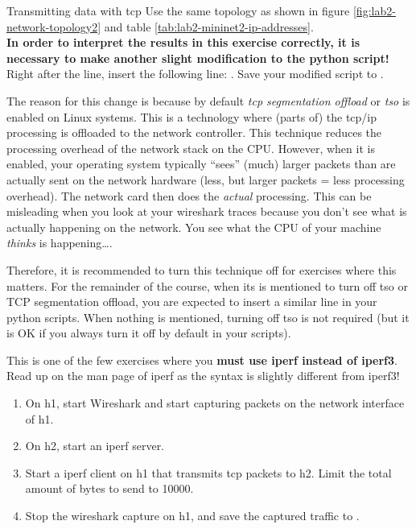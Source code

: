 \begin{exercise}{Transmitting data with \ac{tcp}}
Use the same topology as shown in figure \ref{fig:lab2-network-topology2} and table \ref{tab:lab2-mininet2-ip-addresses}.\\
\remark \textbf{In order to interpret the results in this exercise correctly, it is necessary to make another slight modification to the python script!} Right after the  line, insert the following line: . Save your modified script to .

The reason for this change is because by default \emph{\acs{tcp} segmentation offload} or \emph{tso} is enabled on Linux systems. This is a technology where (parts of) the \acs{tcp}/\acs{ip} processing is offloaded to the network controller. This technique reduces the processing overhead of the network stack on the CPU. However, when it is enabled, your operating system typically ``sees'' (much) larger packets than are actually sent on the network hardware (less, but larger packets = less processing overhead). The network card then does the \emph{actual} processing. This can be misleading when you look at your wireshark traces because you don't see what is actually happening on the network. You see what the CPU of your machine \emph{thinks} is happening\ldots.

Therefore, it is recommended to turn this technique off for exercises where this matters. For the remainder of the course, when its is mentioned to turn off tso or TCP segmentation offload, you are expected to insert a similar line in your python scripts. When nothing is mentioned, turning off tso is not required (but it is OK if you always turn it off by default in your scripts).

\remark This is one of the few exercises where you \textbf{must use iperf instead of iperf3}. Read up on the man page of iperf as the syntax is slightly different from iperf3!

\begin{enumerate}
	\item On h1, start Wireshark and start capturing packets on the network interface of h1. 
	\item On h2, start an iperf server. 
	\item Start a iperf client on h1 that transmits \ac{tcp} packets to h2. Limit the total amount of bytes to send to 10000. 
	\item Stop the wireshark capture on h1, and save the captured traffic to .
\end{enumerate}


\end{exercise}
